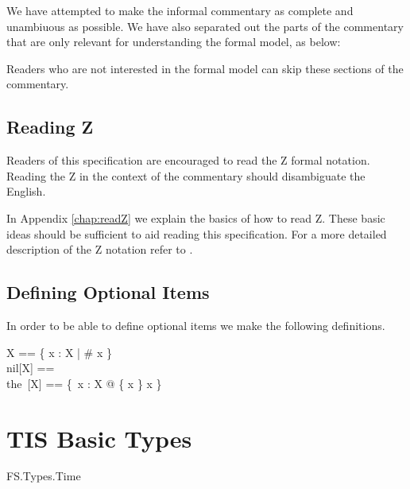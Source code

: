 We have attempted to make the informal commentary as complete and
unambiuous as possible. We have also separated out the parts of the
commentary that are only relevant for understanding the formal model,
as below:
\begin{Zcomment}
\item
Readers who are not interested in the formal model can skip these
sections of the commentary.
\end{Zcomment}

\subsection{Reading Z}
Readers of this specification are encouraged to read the Z formal notation. 
Reading the Z in the context of the commentary should disambiguate the
English. 

In Appendix \ref{chap:readZ} we explain the basics of how to read Z. 
These basic ideas should be sufficient to aid reading this
specification. For a more detailed description of the Z notation refer
to \cite{Spivey}.

\subsection{Defining Optional Items}

In order to be able to define optional items we make the following definitions.

\def\Nil{nil}%
\def\Optional{\mathop{\rm optional}}
\def\The{the~}%

\begin{zed}
        \Optional X == \{ x : \finset X | \# x \}
\\      \Nil[X] == \emptyset[X]
\\      \The[X] == \{~x : X @ \{ x \} \mapsto x \}
\end{zed}

\section{TIS Basic Types}

\begin{traceunit}{FS.Types.Time}
\end{traceunit}

